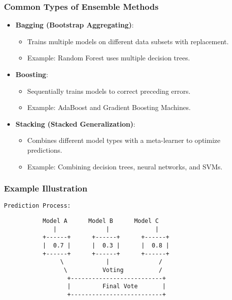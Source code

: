 \documentclass[aspectratio=169]{beamer}
\begin{document}
\begin{frame}[fragile]
    \frametitle{Common Types of Ensemble Methods}
    \begin{itemize}
        \item \textbf{Bagging (Bootstrap Aggregating)}: 
        \begin{itemize}
            \item Trains multiple models on different data subsets with replacement.
            \item Example: Random Forest uses multiple decision trees.
        \end{itemize}
        \item \textbf{Boosting}: 
        \begin{itemize}
            \item Sequentially trains models to correct preceding errors.
            \item Example: AdaBoost and Gradient Boosting Machines.
        \end{itemize}
        \item \textbf{Stacking (Stacked Generalization)}: 
        \begin{itemize}
            \item Combines different model types with a meta-learner to optimize predictions.
            \item Example: Combining decision trees, neural networks, and SVMs.
        \end{itemize}
    \end{itemize}
\end{frame}

\begin{frame}[fragile]
    \frametitle{Example Illustration}
    \begin{center}
    \texttt{Prediction Process:}
    \begin{verbatim}
           Model A      Model B      Model C
              |              |             |
           +------+      +------+      +------+
           |  0.7 |      |  0.3 |      |  0.8 |
           +------+      +------+      +------+
                \            |              /
                 \          Voting          /
                  +--------------------------+   
                  |         Final Vote       |
                  +--------------------------+
    \end{verbatim}
    \end{center}
\end{frame}
\end{document}
